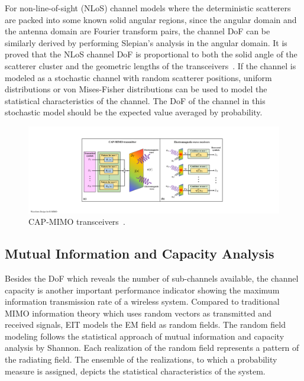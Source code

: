 \documentclass[journal,twocolumn]{IEEEtran}
\begin{document}
For non-line-of-sight (NLoS) channel models where the deterministic scatterers are packed into some known solid angular regions, since the angular domain and the antenna domain are Fourier transform pairs, the channel DoF can be similarly derived by performing Slepian's analysis in the angular domain. It is proved that the NLoS channel DoF is proportional to both the solid angle of the scatterer cluster and the geometric lengths of the transceivers~\cite{poon2005degrees}.  
If the channel is modeled as a stochastic channel with random scatterer positions, uniform distributions or von Mises-Fisher distributions can be used to model the statistical characteristics of the channel. 
The DoF of the channel in this stochastic model should be the expected value averaged by probability.
\begin{figure}[ht]
	\centering 
	\includegraphics[width=0.85\linewidth]{figures/CAPMIMO.pdf} 
	\caption{CAP-MIMO transceivers~\cite{zhang2022pdma}.  }
	\label{fig:CAPMIMO}
\end{figure}

\subsection{Mutual Information and Capacity Analysis}
Besides the DoF which reveals the number of sub-channels available, the channel capacity is another important performance indicator showing the maximum information transmission rate of a wireless system. Compared to traditional MIMO information theory which uses random vectors as transmitted and received signals, EIT models the EM field as random fields. The random field modeling follows the statistical approach of mutual information and capacity analysis by Shannon. Each realization of the random field represents a pattern of the radiating field. The ensemble of the realizations, to which a probability measure is assigned, depicts the statistical characteristics of the system. 
\end{document}
